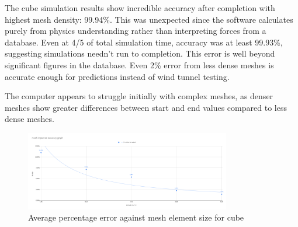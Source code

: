 \documentclass[12pt,a4paper]{article}
\begin{document}
\begin{table}[H]
\centering
\caption{Complete data collected for cube simulation}
\label{tab:cube_results}
\end{table}

The cube simulation results show incredible accuracy after completion with highest mesh density: 99.94\%. This was unexpected since the software calculates purely from physics understanding rather than interpreting forces from a database. Even at 4/5 of total simulation time, accuracy was at least 99.93\%, suggesting simulations needn't run to completion. This error is well beyond significant figures in the database. Even 2\% error from less dense meshes is accurate enough for predictions instead of wind tunnel testing.

The computer appears to struggle initially with complex meshes, as denser meshes show greater differences between start and end values compared to less dense meshes.

\begin{figure}[H]
    \centering
    \includegraphics[width=0.8\textwidth]{image22.png}
    \caption{Average percentage error against mesh element size for cube}
    \label{fig:cube_mesh_error}
\end{figure}
\end{document}
